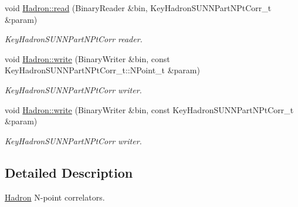 \begin{DoxyCompactItemize}
void \mbox{\hyperlink{namespaceHadron_a475e00d642e0578e7bbe956bbbf37aac}{Hadron\+::read}} (Binary\+Reader \&bin, Key\+Hadron\+S\+U\+N\+N\+Part\+N\+Pt\+Corr\+\_\+t \&param)
\begin{DoxyCompactList}\small\item\em Key\+Hadron\+S\+U\+N\+N\+Part\+N\+Pt\+Corr reader. \end{DoxyCompactList}\item 
void \mbox{\hyperlink{namespaceHadron_acd7055ec4bbdda7ceb335f7271aee72e}{Hadron\+::write}} (Binary\+Writer \&bin, const Key\+Hadron\+S\+U\+N\+N\+Part\+N\+Pt\+Corr\+\_\+t\+::\+N\+Point\+\_\+t \&param)
\begin{DoxyCompactList}\small\item\em Key\+Hadron\+S\+U\+N\+N\+Part\+N\+Pt\+Corr writer. \end{DoxyCompactList}\item 
void \mbox{\hyperlink{namespaceHadron_a767bdf4c228c06edad1c47918ec75ed3}{Hadron\+::write}} (Binary\+Writer \&bin, const Key\+Hadron\+S\+U\+N\+N\+Part\+N\+Pt\+Corr\+\_\+t \&param)
\begin{DoxyCompactList}\small\item\em Key\+Hadron\+S\+U\+N\+N\+Part\+N\+Pt\+Corr writer. \end{DoxyCompactList}\end{DoxyCompactItemize}


\subsection{Detailed Description}
\mbox{\hyperlink{namespaceHadron}{Hadron}} N-\/point correlators. 

